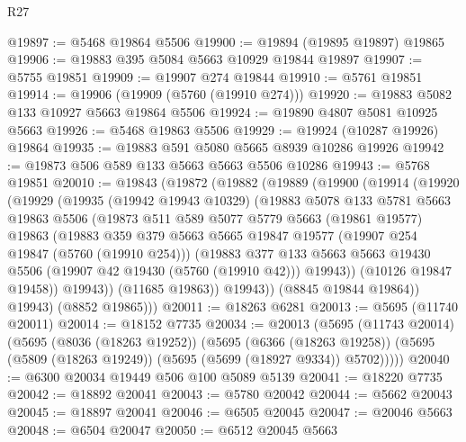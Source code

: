 \begin{lexlean}{R27}
\begin{coremodule}
@19897 := @5468 @19864 @5506
@19900 := @19894 (@19895 @19897) @19865
@19906 := @19883 @395 @5084 @5663 @10929 @19844 @19897
@19907 := @5755 @19851
@19909 := @19907 @274 @19844
@19910 := @5761 @19851
@19914 := @19906 (@19909 (@5760 (@19910 @274)))
@19920 := @19883 @5082 @133 @10927 @5663 @19864 @5506
@19924 := @19890 @4807 @5081 @10925 @5663
@19926 := @5468 @19863 @5506
@19929 := @19924 (@10287 @19926) @19864
@19935 := @19883 @591 @5080 @5665 @8939 @10286 @19926
@19942 := @19873 @506 @589 @133 @5663 @5663 @5506 @10286
@19943 := @5768 @19851
@20010 := @19843
    (@19872
      (@19882
        (@19889
          (@19900
            (@19914
              (@19920
                (@19929
                  (@19935
                    (@19942 @19943 @10329)
                    (@19883
                      @5078
                      @133
                      @5781
                      @5663
                      @19863
                      @5506
                      (@19873
                        @511
                        @589
                        @5077
                        @5779
                        @5663
                        (@19861 @19577)
                        @19863
                        (@19883
                          @359
                          @379
                          @5663
                          @5665
                          @19847
                          @19577
                          (@19907 @254 @19847 (@5760 (@19910 @254)))
                          (@19883
                            @377
                            @133
                            @5663
                            @5663
                            @19430
                            @5506
                            (@19907 @42 @19430 (@5760 (@19910 @42)))
                            @19943))
                        (@10126 @19847 @19458))
                      @19943))
                  (@11685 @19863))
                @19943))
            (@8845 @19844 @19864))
          @19943)
        (@8852 @19865)))
@20011 := @18263 @6281
@20013 := @5695 (@11740 @20011)
@20014 := @18152 @7735
@20034 := @20013
    (@5695
      (@11743 @20014)
      (@5695
        (@8036 (@18263 @19252))
        (@5695
          (@6366 (@18263 @19258))
          (@5695 (@5809 (@18263 @19249)) (@5695 (@5699 (@18927 @9334)) @5702)))))
@20040 := @6300 @20034 @19449 @506 @100 @5089 @5139
@20041 := @18220 @7735
@20042 := @18892 @20041
@20043 := @5780 @20042
@20044 := @5662 @20043
@20045 := @18897 @20041
@20046 := @6505 @20045
@20047 := @20046 @5663
@20048 := @6504 @20047
@20050 := @6512 @20045 @5663

\end{coremodule}
\end{lexlean}

